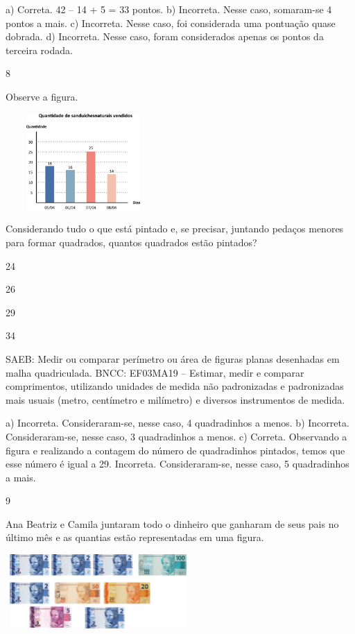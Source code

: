 \begin{multicols}{2}
\begin{enumerate}
{a) Correta. 42 -- 14 + 5 = 33 pontos.
b) Incorreta. Nesse caso, somaram-se 4 pontos a mais.
c) Incorreta. Nesse caso, foi considerada uma pontuação quase dobrada.
d) Incorreta. Nesse caso, foram considerados apenas os pontos da terceira rodada.

\num{8}

Observe a figura.


\includegraphics[width=2.32692in,height=1.43990in]{media/image109.png}

Considerando tudo o que está pintado e, se precisar, juntando pedaços
menores para formar quadrados, quantos quadrados estão pintados?

\begin{escolha}
\item
  24
\item
  26
\item
  29
\item
  34
\end{escolha}


SAEB: Medir ou comparar perímetro ou área de figuras planas
desenhadas em malha quadriculada.
BNCC: EF03MA19 -- Estimar, medir e comparar comprimentos, utilizando unidades de medida
não padronizadas e padronizadas mais usuais (metro, centímetro e milímetro) e diversos
instrumentos de medida.

a) Incorreta. Consideraram-se, nesse caso, 4 quadradinhos a menos.
b) Incorreta. Consideraram-se, nesse caso, 3 quadradinhos a menos.
c) Correta. Observando a figura e realizando a contagem do número de quadradinhos
pintados, temos que esse número é igual a 29.
Incorreta. Consideraram-se, nesse caso, 5 quadradinhos a mais.

\num{9}

Ana Beatriz e Camila juntaram todo o dinheiro que ganharam de seus pais no
último mês e as quantias estão representadas em uma figura.


\includegraphics[width=2.77564in,height=1.11703in]{media/image110.png}

}
\end{enumerate}
\end{multicols}
